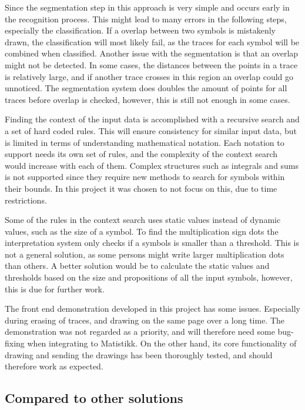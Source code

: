 Since the segmentation step in this approach is very simple and occurs early in the recognition process. This might lead to many errors in the following steps, especially the classification. If a overlap between two symbols is mistakenly drawn, the classification will most likely fail, as the traces for each symbol will be combined when classified. Another issue with the segmentation is that an overlap might not be detected. In some cases, the distances between the points in a trace is relatively large, and if another trace crosses in this region an overlap could go unnoticed. The segmentation system does doubles the amount of points for all traces before overlap is checked, however, this is still not enough in some cases.

Finding the context of the input data is accomplished with a recursive search and a set of hard coded rules. This will ensure consistency for similar input data, but is limited in terms of understanding mathematical notation. Each notation to support needs its own set of rules, and the complexity of the context search would increase with each of them. Complex structures such as integrals and sums is not supported since they require new methods to search for symbols within their bounds. In this project it was chosen to not focus on this, due to time restrictions.

Some of the rules in the context search uses static values instead of dynamic values, such as the size of a symbol. To find the multiplication sign dots the interpretation system only checks if a symbols is smaller than a threshold. This is not a general solution, as some persons might write larger multiplication dots than others. A better solution would be to calculate the static values and thresholds based on the size and propositions of all the input symbols, however, this is due for further work.

The front end demonstration developed in this project has some issues. Especially during erasing of traces, and drawing on the same page over a long time. The demonstration was not regarded as a priority, and will therefore need some bug-fixing when integrating to Matistikk. On the other hand, its core functionality of drawing and sending the drawings has been thoroughly tested, and should therefore work as expected.

\subsection{Compared to other solutions}

